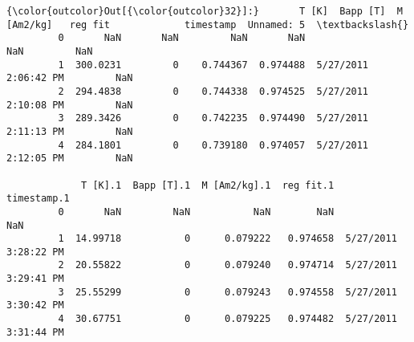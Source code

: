 \documentclass{article}
\begin{document}
            \begin{Verbatim}[commandchars=\\\{\}]
{\color{outcolor}Out[{\color{outcolor}32}]:}       T [K]  Bapp [T]  M [Am2/kg]   reg fit             timestamp  Unnamed: 5  \textbackslash{}
         0       NaN       NaN         NaN       NaN                   NaN         NaN   
         1  300.0231         0    0.744367  0.974488  5/27/2011 2:06:42 PM         NaN   
         2  294.4838         0    0.744338  0.974525  5/27/2011 2:10:08 PM         NaN   
         3  289.3426         0    0.742235  0.974490  5/27/2011 2:11:13 PM         NaN   
         4  284.1801         0    0.739180  0.974057  5/27/2011 2:12:05 PM         NaN   
         
             T [K].1  Bapp [T].1  M [Am2/kg].1  reg fit.1           timestamp.1  
         0       NaN         NaN           NaN        NaN                   NaN  
         1  14.99718           0      0.079222   0.974658  5/27/2011 3:28:22 PM  
         2  20.55822           0      0.079240   0.974714  5/27/2011 3:29:41 PM  
         3  25.55299           0      0.079243   0.974558  5/27/2011 3:30:42 PM  
         4  30.67751           0      0.079225   0.974482  5/27/2011 3:31:44 PM  
\end{Verbatim}
        
\end{document}
